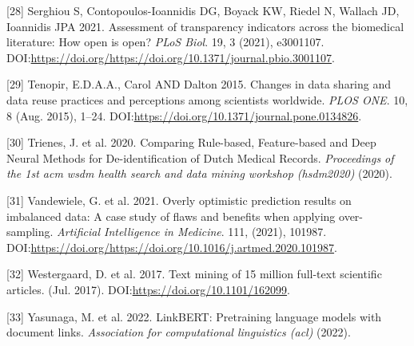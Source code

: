 \documentclass[
]{article}
\newenvironment{cslreferences}%
  {}%
  {\par}
\begin{document}
\begin{cslreferences}
\leavevmode\hypertarget{ref-10.1371ux2fjournal.pbio.3001107}{}%
{[}28{]} Serghiou S, Contopoulos-Ioannidis DG, Boyack KW, Riedel N,
Wallach JD, Ioannidis JPA 2021. Assessment of transparency indicators
across the biomedical literature: How open is open? \emph{PLoS Biol}.
19, 3 (2021), e3001107.
DOI:\url{https://doi.org/https://doi.org/10.1371/journal.pbio.3001107}.

\leavevmode\hypertarget{ref-10.1371ux2fjournal.pone.0134826}{}%
{[}29{]} Tenopir, E.D.A.A., Carol AND Dalton 2015. Changes in data
sharing and data reuse practices and perceptions among scientists
worldwide. \emph{PLOS ONE}. 10, 8 (Aug. 2015), 1--24.
DOI:\url{https://doi.org/10.1371/journal.pone.0134826}.

\leavevmode\hypertarget{ref-2020200105714T}{}%
{[}30{]} Trienes, J. et al. 2020. Comparing Rule-based, Feature-based
and Deep Neural Methods for De-identification of Dutch Medical Records.
\emph{Proceedings of the 1st acm wsdm health search and data mining
workshop (hsdm2020)} (2020).

\leavevmode\hypertarget{ref-VANDEWIELE2021101987}{}%
{[}31{]} Vandewiele, G. et al. 2021. Overly optimistic prediction
results on imbalanced data: A case study of flaws and benefits when
applying over-sampling. \emph{Artificial Intelligence in Medicine}. 111,
(2021), 101987.
DOI:\url{https://doi.org/https://doi.org/10.1016/j.artmed.2020.101987}.

\leavevmode\hypertarget{ref-Westergaard_2017}{}%
{[}32{]} Westergaard, D. et al. 2017. Text mining of 15 million
full-text scientific articles. (Jul. 2017).
DOI:\url{https://doi.org/10.1101/162099}.

\leavevmode\hypertarget{ref-yasunaga2022linkbert}{}%
{[}33{]} Yasunaga, M. et al. 2022. LinkBERT: Pretraining language models
with document links. \emph{Association for computational linguistics
(acl)} (2022).
\end{cslreferences}
\end{document}
